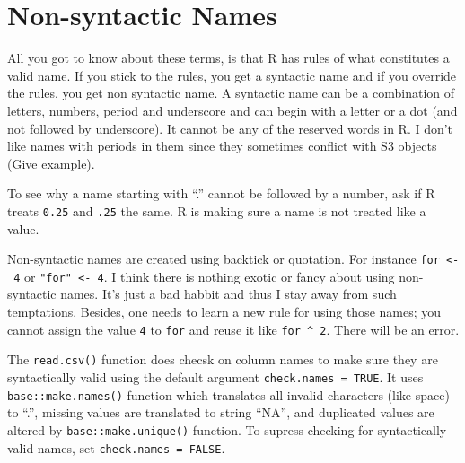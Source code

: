 \documentclass[]{book}
\newenvironment{Shaded}{\begin{snugshade}}{\end{snugshade}}
\newcommand{\DataTypeTok}[1]{\textcolor[rgb]{0.13,0.29,0.53}{#1}}
\newcommand{\DecValTok}[1]{\textcolor[rgb]{0.00,0.00,0.81}{#1}}
\newcommand{\KeywordTok}[1]{\textcolor[rgb]{0.13,0.29,0.53}{\textbf{#1}}}
\newcommand{\NormalTok}[1]{#1}
\newcommand{\OperatorTok}[1]{\textcolor[rgb]{0.81,0.36,0.00}{\textbf{#1}}}
\newcommand{\OtherTok}[1]{\textcolor[rgb]{0.56,0.35,0.01}{#1}}
\newcommand{\StringTok}[1]{\textcolor[rgb]{0.31,0.60,0.02}{#1}}
\begin{document}
\hypertarget{non-syntactic-names}{%
\section{Non-syntactic Names}\label{non-syntactic-names}}

All you got to know about these terms, is that R has rules of what constitutes a valid name. If you stick to the rules, you get a syntactic name and if you override the rules, you get non syntactic name. A syntactic name can be a combination of letters, numbers, period and underscore and can begin with a letter or a dot (and not followed by underscore). It cannot be any of the reserved words in R. I don't like names with periods in them since they sometimes conflict with S3 objects (Give example).

To see why a name starting with ``.'' cannot be followed by a number, ask if R treats \texttt{0.25} and \texttt{.25} the same. R is making sure a name is not treated like a value.

Non-syntactic names are created using backtick or quotation. For instance \texttt{\textasciigrave{}for\textasciigrave{}\ \textless{}-\ 4} or \texttt{"for"\ \textless{}-\ 4}. I think there is nothing exotic or fancy about using non-syntactic names. It's just a bad habbit and thus I stay away from such temptations. Besides, one needs to learn a new rule for using those names; you cannot assign the value \texttt{4} to \texttt{\textasciigrave{}for\textasciigrave{}} and reuse it like \texttt{for\ \^{}\ 2}. There will be an error.

The \texttt{read.csv()} function does checsk on column names to make sure they are syntactically valid using the default argument \texttt{check.names\ =\ TRUE}. It uses \texttt{base::make.names()} function which translates all invalid characters (like space) to ``.'', missing values are translated to string ``NA'', and duplicated values are altered by \texttt{base::make.unique()} function. To supress checking for syntactically valid names, set \texttt{check.names\ =\ FALSE}.

\begin{Shaded}
\end{Shaded}
\end{document}
